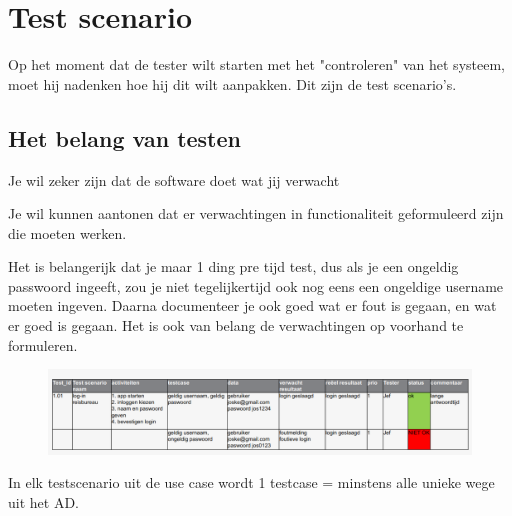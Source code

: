 \documentclass{article}
\begin{document}
\section{Test scenario}

Op het moment dat de tester wilt starten met het "controleren" van het systeem, moet hij nadenken hoe hij dit wilt aanpakken. Dit zijn de test scenario's.

\subsection{Het belang van testen}
Je wil zeker zijn dat de software doet wat jij verwacht

Je wil kunnen aantonen dat er verwachtingen in functionaliteit geformuleerd zijn die moeten werken.

Het is belangerijk dat je maar 1 ding pre tijd test, dus als je een ongeldig passwoord ingeeft, zou je niet tegelijkertijd ook nog eens een ongeldige username moeten ingeven.
Daarna documenteer je ook goed wat er fout is gegaan, en wat er goed is gegaan. Het is ook van belang de verwachtingen op voorhand te formuleren.

\begin{figure}[h]
  \includegraphics[width=1\linewidth]{tests.png}
\end{figure}

In elk testscenario uit de use case wordt 1 testcase = minstens alle unieke wege uit het AD.
\end{document}
